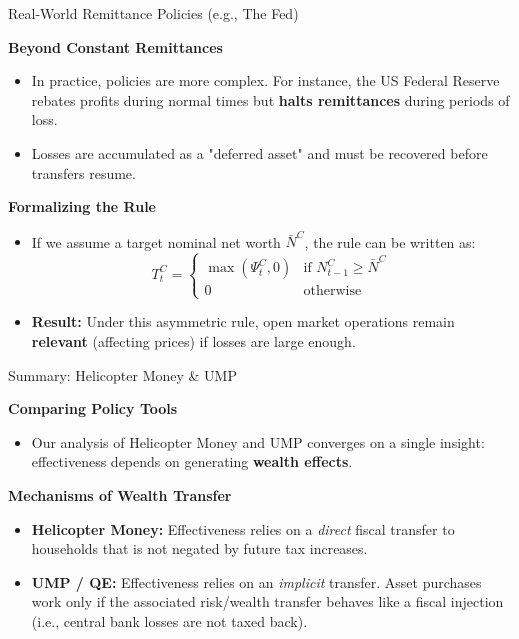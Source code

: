 \documentclass[11pt,aspectratio=169]{beamer}
\begin{document}
\begin{frame}{Real-World Remittance Policies (e.g., The Fed)}
\small

\textbf{Beyond Constant Remittances}
\begin{itemize}
    \item In practice, policies are more complex. For instance, the US Federal Reserve rebates profits during normal times but \textbf{halts remittances} during periods of loss.
    \item Losses are accumulated as a "deferred asset" and must be recovered before transfers resume.
\end{itemize}

\vspace{0.2cm}

\textbf{Formalizing the Rule}
\begin{itemize}
    \item If we assume a target nominal net worth $\bar{N}^{C}$, the rule can be written as:
    \begin{equation*}
        T_{t}^{C} =
        \begin{cases}
            \max (\Psi _{t}^{C},0) & \text{if } N_{t-1}^{C}\geq \bar{N}^{C} \\
            0 & \text{otherwise}
        \end{cases}
    \end{equation*}
    \item \textbf{Result:} Under this asymmetric rule, open market operations remain \textbf{relevant} (affecting prices) if losses are large enough.
\end{itemize}
\end{frame}

\begin{frame}{Summary: Helicopter Money \& UMP}
\small

\textbf{Comparing Policy Tools}
\begin{itemize}
    \item Our analysis of Helicopter Money and UMP converges on a single insight: effectiveness depends on generating \textbf{wealth effects}.
\end{itemize}

\vspace{0.3cm}

\textbf{Mechanisms of Wealth Transfer}
\begin{itemize}
    \item \textbf{Helicopter Money:} Effectiveness relies on a \textit{direct} fiscal transfer to households that is not negated by future tax increases.
    \item \textbf{UMP / QE:} Effectiveness relies on an \textit{implicit} transfer. Asset purchases work only if the associated risk/wealth transfer behaves like a fiscal injection (i.e., central bank  losses are not taxed back).
\end{itemize}
\end{frame}
\end{document}
